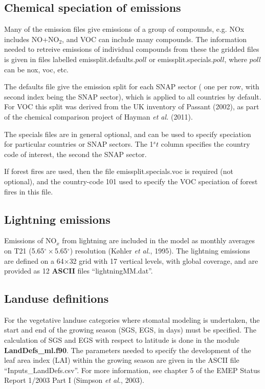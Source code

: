 \subsection{Chemical speciation of emissions}

Many of the emission files give emissions of a group of compounds, e.g.
NOx includes NO+NO$_2$, and VOC can include many compounds. The information
needed to retreive emissions of individual compounds from these the
gridded files is given in  files labelled emissplit.defaults.$poll$ or
emissplit.specials.$poll$, where $poll$ can be nox, voc, etc.

The defaults file give the emission split for each SNAP sector (
one per row, with second index being the SNAP sector), which
is applied to all countries by default. For VOC this split
was derived from the UK inventory of Passant (2002),
as part of the chemical comparison project of Hayman {\sl et al.} (2011).

The specials files are in general optional, and can be used to specify
speciation for particular countries or SNAP sectors. The
1${^st}$ column specifies the country code of interest, the second the SNAP sector. 

If forest fires are used, then the file emissplit.specials.voc is required
(not optional), and the country-code 101 used to specify the VOC speciation
of forest fires in this file.

\subsection{Lightning emissions}
Emissions of NO$_{x}$ from lightning are included in the model
as monthly averages on T21 (5.65$^{\circ}\times$5.65$^{\circ}$) resolution (K{\o}hler {\sl et al.}, 1995). 
The lightning emissions are defined on a 64$\times$32 grid with 17 vertical
levels, with global coverage, and are provided as 12 {\bf ASCII} files
``lightningMM.dat''.

\subsection{Landuse definitions}
For the vegetative landuse categories where stomatal modeling is
undertaken, the start and end of the growing season (SGS, EGS, in days) must be specified. 
The calculation of SGS and EGS with respect to latitude is done 
in the module {\bf LandDefs\_ml.f90}. 
The parameters needed to specify the
development of the leaf area index (LAI) within the growing season
are given in the ASCII file ``Inputs\_LandDefs.csv''. 
For more information, see chapter 5  of the EMEP Status Report 1/2003 Part I (Simpson {\sl et al.}, 2003).


